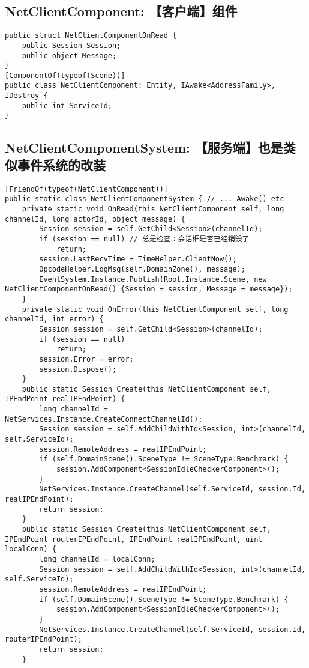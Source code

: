 \documentclass[9pt, b5paper]{article}
\begin{document}
\subsection{NetClientComponent: 【客户端】组件}
\label{sec-1-5}
\begin{verbatim}
public struct NetClientComponentOnRead {
    public Session Session;
    public object Message;
}
[ComponentOf(typeof(Scene))]
public class NetClientComponent: Entity, IAwake<AddressFamily>, IDestroy {
    public int ServiceId;
}
\end{verbatim}
\subsection{NetClientComponentSystem: 【服务端】也是类似事件系统的改装}
\label{sec-1-6}
\begin{verbatim}
[FriendOf(typeof(NetClientComponent))]
public static class NetClientComponentSystem { // ... Awake() etc
    private static void OnRead(this NetClientComponent self, long channelId, long actorId, object message) {
        Session session = self.GetChild<Session>(channelId);
        if (session == null) // 总是检查：会话框是否已经销毁了 
            return;
        session.LastRecvTime = TimeHelper.ClientNow();
        OpcodeHelper.LogMsg(self.DomainZone(), message);
        EventSystem.Instance.Publish(Root.Instance.Scene, new NetClientComponentOnRead() {Session = session, Message = message});
    }
    private static void OnError(this NetClientComponent self, long channelId, int error) {
        Session session = self.GetChild<Session>(channelId);
        if (session == null) 
            return;
        session.Error = error;
        session.Dispose();
    }
    public static Session Create(this NetClientComponent self, IPEndPoint realIPEndPoint) {
        long channelId = NetServices.Instance.CreateConnectChannelId();
        Session session = self.AddChildWithId<Session, int>(channelId, self.ServiceId);
        session.RemoteAddress = realIPEndPoint;
        if (self.DomainScene().SceneType != SceneType.Benchmark) {
            session.AddComponent<SessionIdleCheckerComponent>();
        }
        NetServices.Instance.CreateChannel(self.ServiceId, session.Id, realIPEndPoint);
        return session;
    }
    public static Session Create(this NetClientComponent self, IPEndPoint routerIPEndPoint, IPEndPoint realIPEndPoint, uint localConn) {
        long channelId = localConn;
        Session session = self.AddChildWithId<Session, int>(channelId, self.ServiceId);
        session.RemoteAddress = realIPEndPoint;
        if (self.DomainScene().SceneType != SceneType.Benchmark) {
            session.AddComponent<SessionIdleCheckerComponent>();
        }
        NetServices.Instance.CreateChannel(self.ServiceId, session.Id, routerIPEndPoint);
        return session;
    }
\end{verbatim}
\end{document}
